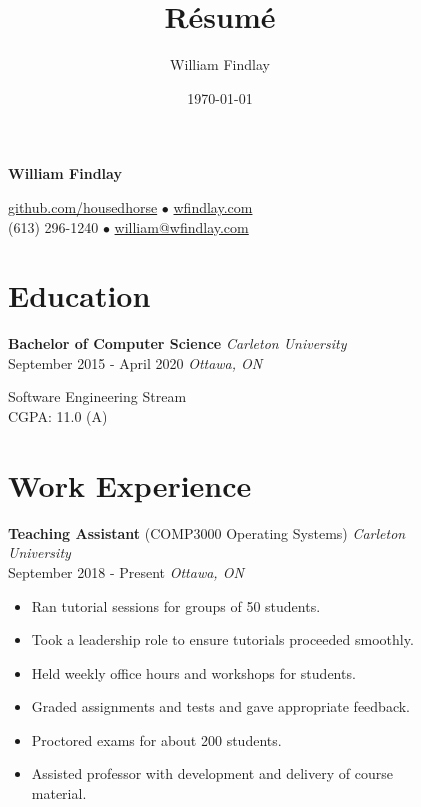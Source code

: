 \documentclass[]{article}
\title{Résumé}
\author{William Findlay}
\date{\today}
\theoremstyle{plain}
\theoremstyle{remark}
\theoremstyle{definition}
\renewcommand{\maketitle}{\relax}
\begin{document}
\maketitle

\begin{figure}
\small
\begin{minipage}[t]{0.65\textwidth}
\begin{center}
{\Huge\bfseries {\color{gray}William} Findlay}

\color{gray}

\href{https://www.github.com/housedhorse}{\color{gray}github.com/housedhorse} $\bullet$ \href{http://www.wfindlay.com}{\color{gray}wfindlay.com}\\
{\color{gray}(613) 296-1240} $\bullet$ \href{mailto:william@wfindlay.com}{\color{gray}william@wfindlay.com}
\end{center}

\color{gray}

\section{Education}
\color{black}
\textbf{Bachelor of Computer Science} \hfill \emph{Carleton University}\\
{September 2015 - April 2020} \hfill\emph {Ottawa, ON}
\color{gray}

Software Engineering Stream\\
CGPA: 11.0 (A)


\section{Work Experience}

\color{black}
\textbf{Teaching Assistant} (COMP3000 Operating Systems) \hfill \emph{Carleton University}\\
September 2018 - Present \hfill\emph {Ottawa, ON}
\color{gray}
\begin{itemize}[itemsep=0em]
\item Ran tutorial sessions for groups of 50 students.
\item Took a leadership role to ensure tutorials proceeded smoothly.
\item Held weekly office hours and workshops for students.
\item Graded assignments and tests and gave appropriate feedback.
\item Proctored exams for about 200 students.
\item Assisted professor with development and delivery of course material.
\end{itemize}


\end{minipage}
\end{figure}
\end{document}
